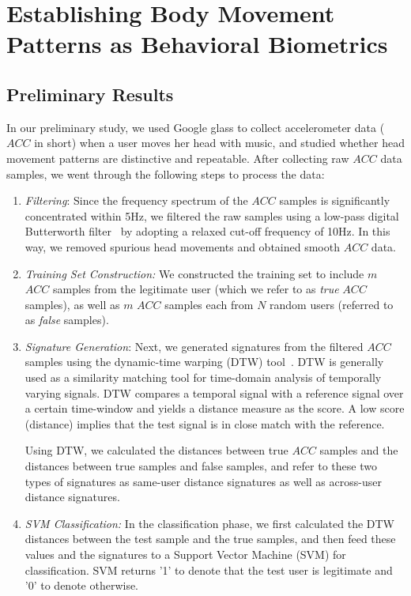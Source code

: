 \section{Establishing Body Movement Patterns as Behavioral Biometrics}\label{sec:learning}

\subsection{Preliminary Results}
In our preliminary study, we used Google glass to collect accelerometer data ($ACC$ in short) when a user moves her head with music, and studied whether head movement patterns are distinctive and repeatable. After collecting raw $ACC$ data samples, we went through the following steps to process the data:

\begin{enumerate}
\item \emph{Filtering}: Since the frequency spectrum of the $ACC$ samples is significantly concentrated within 5Hz, we filtered the raw samples using a low-pass digital Butterworth filter~\cite{challis1983design} by adopting a relaxed cut-off frequency of 10Hz. In this way, we removed spurious head movements and obtained smooth $ACC$ data.

\item \emph{Training Set Construction:} We constructed the training set to include $m$ $ACC$ samples from the legitimate user (which we refer to as \emph{true} $ACC$ samples), as well as $m$ $ACC$ samples each from $N$ random users (referred to as \emph{false} samples).

\item \emph{Signature Generation}: Next, we generated signatures from the filtered $ACC$ samples using the dynamic-time warping (DTW) tool~\cite{***}. DTW is generally used as a similarity matching tool for time-domain analysis of temporally varying signals. DTW compares a temporal signal with a reference signal over a certain time-window and yields a distance measure as the score. A low score (distance) implies that the test signal is in close match with the reference.

    Using DTW, we calculated the distances between true $ACC$ samples and the distances between true samples and false samples, and refer to these two types of signatures as same-user distance signatures as well as across-user distance signatures.

\item \emph{SVM Classification:} In the classification phase, we first calculated the DTW distances between the test sample and the true samples, and then feed these values and the signatures to a Support Vector Machine (SVM) for classification. SVM returns '1' to denote that the test user is legitimate and '0' to denote otherwise.

\end{enumerate}


